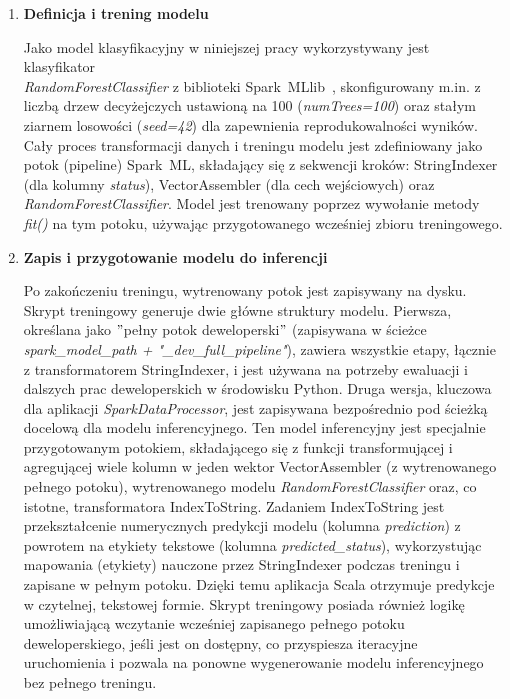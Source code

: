 \begin{enumerate}
    \item \textbf{Definicja i trening modelu}

Jako model klasyfikacyjny w niniejszej pracy wykorzystywany jest klasyfikator \\ \textit{RandomForestClassifier} z biblioteki \mbox{Spark MLlib}~\cite{spark_mllib_reference}, skonfigurowany m.in. z liczbą drzew decyżejczych ustawioną na 100 (\textit{numTrees=100}) oraz stałym ziarnem losowości (\textit{seed=42}) dla zapewnienia reprodukowalności wyników. Cały proces transformacji danych i treningu modelu jest zdefiniowany jako potok (pipeline) \mbox{Spark ML}, składający się z sekwencji kroków: StringIndexer (dla kolumny \textit{status}), VectorAssembler (dla cech wejściowych) oraz \textit{RandomForestClassifier}. Model jest trenowany poprzez wywołanie metody \textit{fit()} na tym potoku, używając przygotowanego wcześniej zbioru treningowego.

    \item \textbf{Zapis i przygotowanie modelu do inferencji}

Po zakończeniu treningu, wytrenowany potok jest zapisywany na dysku. Skrypt treningowy generuje dwie główne struktury modelu. Pierwsza, określana jako \("\)pełny potok deweloperski\("\) (zapisywana w ścieżce \textit{spark\_model\_path + "\_dev\_full\_pipeline"}), zawiera wszystkie etapy, łącznie z transformatorem StringIndexer, i jest używana na potrzeby ewaluacji i dalszych prac deweloperskich w środowisku Python. Druga wersja, kluczowa dla aplikacji \textit{SparkDataProcessor}, jest zapisywana bezpośrednio pod ścieżką docelową dla modelu inferencyjnego. Ten model inferencyjny jest specjalnie przygotowanym potokiem, składającego się z funkcji transformującej i agregującej wiele kolumn w jeden wektor VectorAssembler (z wytrenowanego pełnego potoku), wytrenowanego modelu \textit{RandomForestClassifier} oraz, co istotne, transformatora IndexToString. Zadaniem IndexToString jest przekształcenie numerycznych predykcji modelu (kolumna \textit{prediction}) z powrotem na etykiety tekstowe (kolumna \textit{predicted\_status}), wykorzystując mapowania (etykiety) nauczone przez StringIndexer podczas treningu i zapisane w pełnym potoku. Dzięki temu aplikacja Scala otrzymuje predykcje w czytelnej, tekstowej formie. Skrypt treningowy posiada również logikę umożliwiającą wczytanie wcześniej zapisanego pełnego potoku deweloperskiego, jeśli jest on dostępny, co przyspiesza iteracyjne uruchomienia i pozwala na ponowne wygenerowanie modelu inferencyjnego bez pełnego treningu.


\end{enumerate}
